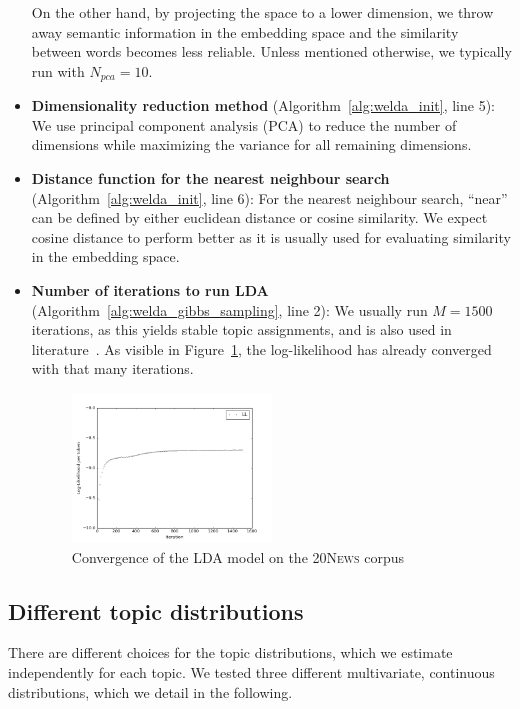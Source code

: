 \documentclass[
        a4paper,
        titlepage,
        twoside,
        parskip
        ]{scrbook}
\theoremstyle{break}
\begin{document}
\begin{itemize}
    On the other hand, by projecting the space to a lower dimension, we throw away semantic information in the embedding space and the similarity between words becomes less reliable.
    Unless mentioned otherwise, we typically run with $N_{pca} = 10$.
  \item \textbf{Dimensionality reduction method} (Algorithm~\ref{alg:welda_init}, line 5):
    We use principal component analysis (PCA) to reduce the number of dimensions while maximizing the variance for all remaining dimensions.
  \item \textbf{Distance function for the nearest neighbour search} (Algorithm~\ref{alg:welda_init}, line 6):
    For the nearest neighbour search, ``near'' can be defined by either euclidean distance or cosine similarity.
    We expect cosine distance to perform better as it is usually used for evaluating similarity in the embedding space.
  \item \textbf{Number of iterations to run LDA} (Algorithm~\ref{alg:welda_gibbs_sampling}, line 2):
    We usually run $M = 1500$ iterations, as this yields stable topic assignments, and is also used in literature~\cite{Nguyen2015}.
    As visible in Figure~\ref{fig:ll_lda_convergence}, the log-likelihood has already converged with that many iterations.
    \begin{figure}
           \centering
           \includegraphics[width=0.5\textwidth]{figures/ll_lda_convergence.png}
           \caption{Convergence of the LDA model on the \textsc{20News} corpus}
           \label{fig:ll_lda_convergence}
    \end{figure}
\end{itemize}

\subsection{Different topic distributions}

There are different choices for the topic distributions, which we estimate independently for each topic.
We tested three different multivariate, continuous distributions, which we detail in the following.
\end{document}
